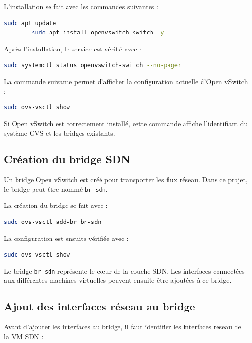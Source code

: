\documentclass[12pt,a4paper,oneside]{report}
\begin{document}
	L'installation se fait avec les commandes suivantes :
	
	\begin{lstlisting}[language=bash]
		sudo apt update
		sudo apt install openvswitch-switch -y
	\end{lstlisting}
	
	Après l'installation, le service est vérifié avec :
	
	\begin{lstlisting}[language=bash]
		sudo systemctl status openvswitch-switch --no-pager
	\end{lstlisting}
	
	La commande suivante permet d'afficher la configuration actuelle d'Open vSwitch :
	
	\begin{lstlisting}[language=bash]
		sudo ovs-vsctl show
	\end{lstlisting}
	
	Si Open vSwitch est correctement installé, cette commande affiche l'identifiant du système OVS et les bridges existants.
	
	\subsection{Création du bridge SDN}
	
	Un bridge Open vSwitch est créé pour transporter les flux réseau. Dans ce projet, le bridge peut être nommé \texttt{br-sdn}.
	
	La création du bridge se fait avec :
	
	\begin{lstlisting}[language=bash]
		sudo ovs-vsctl add-br br-sdn
	\end{lstlisting}
	
	La configuration est ensuite vérifiée avec :
	
	\begin{lstlisting}[language=bash]
		sudo ovs-vsctl show
	\end{lstlisting}
	
	Le bridge \texttt{br-sdn} représente le cœur de la couche SDN. Les interfaces connectées aux différentes machines virtuelles peuvent ensuite être ajoutées à ce bridge.
	
	\subsection{Ajout des interfaces réseau au bridge}
	
	Avant d'ajouter les interfaces au bridge, il faut identifier les interfaces réseau de la VM SDN :
	
\end{document}
